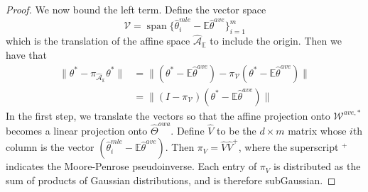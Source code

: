 \documentclass[twoside]{article}
\DeclareMathOperator*{\vecspan}{span}
\newcommand{\matV}{\hat V}
\newcommand{\W}{{\hat \Theta^{\textit{owa}}}}
\newcommand{\Waff}{\mathcal{\hat A}}
\newcommand{\WaffE}{{\mathcal{\hat A}_\E}}
\newcommand{\Wtave}{{\mathcal{W}^{ave,*}}}
\newcommand{\V}{\mathcal{V}}
\newcommand{\E}{\mathbb{E}}
\newcommand{\w}{\theta}
\newcommand{\wave}{\hat\w^{ave}}
\newcommand{\wtave}{\E\hat\w^{ave}}
\newcommand{\wmle}{\hat\w^{mle}}
\newcommand{\wstar}{{\w^{*}}}
\newcommand{\ltwo}[1]{{\lVert {#1} \rVert}}
\newcommand{\proj}[1]{\pi_{{#1}}}
\begin{document}
\begin{proof}
{%

We now bound the left term.
Define the vector space
\begin{equation}
\V=\vecspan \{\wmle_i - \wtave\}_{i=1}^m
\end{equation}
which is the translation of the affine space $\WaffE$ to include the origin.
Then we have that
\begin{align}
\ltwo{\wstar-\proj\WaffE\wstar}
&=
\ltwo{(\wstar-\wtave)-\proj\V(\wstar-\wtave)}
\\&=
\ltwo{(I-\proj\V)(\wstar-\wtave)}
\end{align}
In the first step, we translate the vectors so that the affine projection onto $\Wtave$ becomes a linear projection onto $\W$.
Define $\matV$ to be the $d \times m$ matrix whose $i$th column is the vector $(\wmle_i - \E\wave)$.
Then $\proj{V} = \matV\matV^+$, where the superscript $^+$ indicates the Moore-Penrose pseudoinverse.
Each entry of $\proj{V}$ is distributed as the sum of products of Gaussian distributions,
and is therefore subGaussian.
}
\end{proof}

\clearpage
\end{document}
